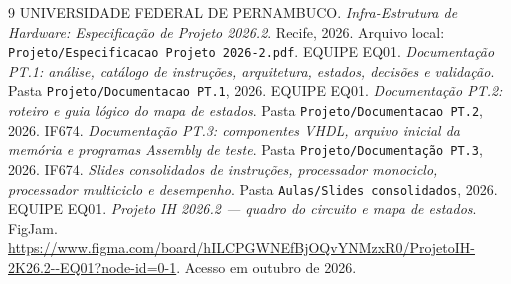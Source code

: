 \begin{thebibliography}{9}
 UNIVERSIDADE FEDERAL DE PERNAMBUCO. \emph{Infra-Estrutura de Hardware: Especificação de Projeto 2026.2}. Recife, 2026. Arquivo local: \texttt{Projeto/Especificacao Projeto 2026-2.pdf}.
 EQUIPE EQ01. \emph{Documentação PT.1: análise, catálogo de instruções, arquitetura, estados, decisões e validação}. Pasta \texttt{Projeto/Documentacao PT.1}, 2026.
 EQUIPE EQ01. \emph{Documentação PT.2: roteiro e guia lógico do mapa de estados}. Pasta \texttt{Projeto/Documentacao PT.2}, 2026.
 IF674. \emph{Documentação PT.3: componentes VHDL, arquivo inicial da memória e programas Assembly de teste}. Pasta \texttt{Projeto/Documentação PT.3}, 2026.
 IF674. \emph{Slides consolidados de instruções, processador monociclo, processador multiciclo e desempenho}. Pasta \texttt{Aulas/Slides consolidados}, 2026.
 EQUIPE EQ01. \emph{Projeto IH 2026.2 — quadro do circuito e mapa de estados}. FigJam. \url{https://www.figma.com/board/hILCPGWNEfBjOQvYNMzxR0/ProjetoIH-2K26.2--EQ01?node-id=0-1}. Acesso em outubro de 2026.
\end{thebibliography}
